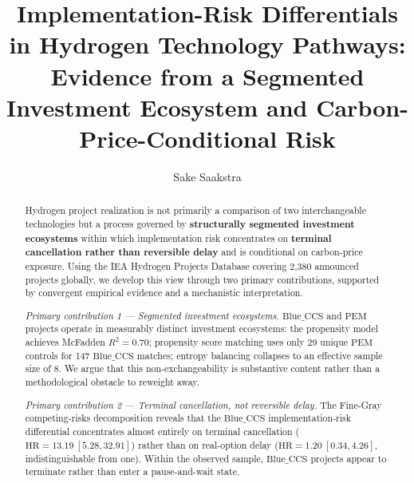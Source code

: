 \documentclass[review,authoryear,11pt]{elsarticle}
\newcommand{\HR}{\mathrm{HR}}
\newcommand{\BlueCCS}{\mathrm{Blue\_CCS}}
\newcommand{\PEM}{\mathrm{PEM}}
\begin{document}
\begin{frontmatter}

\title{Implementation-Risk Differentials in Hydrogen Technology Pathways:\\
Evidence from a Segmented Investment Ecosystem and Carbon-Price-Conditional Risk}

\author[vu,gas]{Sake Saakstra}



\begin{abstract}
\noindent Hydrogen project realization is not primarily a comparison of two interchangeable technologies but a process governed by \textbf{structurally segmented investment ecosystems} within which implementation risk concentrates on \textbf{terminal cancellation rather than reversible delay} and is conditional on carbon-price exposure. Using the IEA Hydrogen Projects Database covering 2,380 announced projects globally, we develop this view through two primary contributions, supported by convergent empirical evidence and a mechanistic interpretation.

\smallskip\noindent\textit{Primary contribution 1 --- Segmented investment ecosystems.} $\BlueCCS$ and $\PEM$ projects operate in measurably distinct investment ecosystems: the propensity model achieves McFadden $R^2 = 0.70$; propensity score matching uses only 29 unique $\PEM$ controls for 147 $\BlueCCS$ matches; entropy balancing collapses to an effective sample size of 8. We argue that this non-exchangeability is substantive content rather than a methodological obstacle to reweight away.

\smallskip\noindent\textit{Primary contribution 2 --- Terminal cancellation, not reversible delay.} The Fine-Gray competing-risks decomposition reveals that the $\BlueCCS$ implementation-risk differential concentrates almost entirely on terminal cancellation ($\HR = 13.19\ [5.28, 32.91]$) rather than on real-option delay ($\HR = 1.20\ [0.34, 4.26]$, indistinguishable from one). Within the observed sample, $\BlueCCS$ projects appear to terminate rather than enter a pause-and-wait state.


\end{abstract}
\end{frontmatter}
\end{document}
